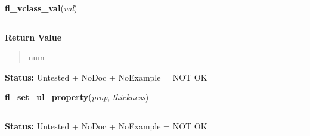     \label{xformslib:library:fl_vclass_val}

    \vspace{0.5ex}

\hspace{.8\funcindent}\begin{boxedminipage}{\funcwidth}

    \raggedright \textbf{fl\_vclass\_val}(\textit{val})

    \vspace{-1.5ex}

    \rule{\textwidth}{0.5\fboxrule}
\setlength{\parskip}{2ex}
\setlength{\parskip}{1ex}
      \textbf{Return Value}
    \vspace{-1ex}

      \begin{quote}
      num

      \end{quote}

\textbf{Status:} Untested + NoDoc + NoExample = NOT OK



    \end{boxedminipage}

    \label{xformslib:library:fl_set_ul_property}

    \vspace{0.5ex}

\hspace{.8\funcindent}\begin{boxedminipage}{\funcwidth}

    \raggedright \textbf{fl\_set\_ul\_property}(\textit{prop}, \textit{thickness})

    \vspace{-1.5ex}

    \rule{\textwidth}{0.5\fboxrule}
\setlength{\parskip}{2ex}
\setlength{\parskip}{1ex}
\textbf{Status:} Untested + NoDoc + NoExample = NOT OK



    \end{boxedminipage}

    \label{xformslib:library:fl_set_clipping}

